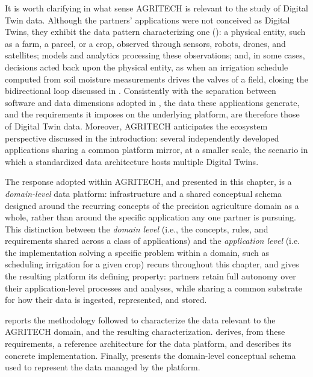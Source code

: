 It is worth clarifying in what sense AGRITECH is relevant to the study of Digital Twin data. Although the partners' applications were not conceived as Digital Twins, they exhibit the data pattern characterizing one (): a physical entity, such as a farm, a parcel, or a crop, observed through sensors, robots, drones, and satellites; models and analytics processing these observations; and, in some cases, decisions acted back upon the physical entity, as when an irrigation schedule computed from soil moisture measurements drives the valves of a field, closing the bidirectional loop discussed in . Consistently with the separation between software and data dimensions adopted in , the data these applications generate, and the requirements it imposes on the underlying platform, are therefore those of Digital Twin data. Moreover, AGRITECH anticipates the ecosystem perspective discussed in the introduction: several independently developed applications sharing a common platform mirror, at a smaller scale, the scenario in which a standardized data architecture hosts multiple Digital Twins.

The response adopted within AGRITECH, and presented in this chapter, is a \emph{domain-level} data platform: infrastructure and a shared conceptual schema designed around the recurring concepts of the precision agriculture domain as a whole, rather than around the specific application any one partner is pursuing. This distinction between the \emph{domain level} (i.e.,  the concepts, rules, and requirements shared across a class of applications) and the \emph{application level} (i.e. the implementation solving a specific problem within a domain, such as scheduling irrigation for a given crop) recurs throughout this chapter, and gives the resulting platform its defining property: partners retain full autonomy over their application-level processes and analyses, while sharing a common substrate for how their data is ingested, represented, and stored.

 reports the methodology followed to characterize the data relevant to the AGRITECH domain, and the resulting characterization.  derives, from these requirements, a reference architecture for the data platform, and  describes its concrete implementation. Finally,  presents the domain-level conceptual schema used to represent the data managed by the platform.

